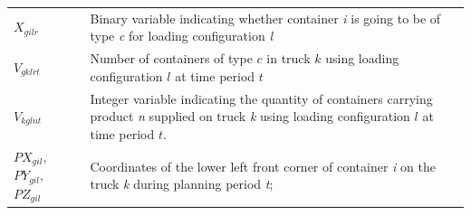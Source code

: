 \begin{longtable}[hbt!]{  |p{}|p{}  |}
  \textit{$X_{gilr}$}                                                                            & Binary variable indicating whether container \textit{i} is going to be of type \textit{c} for loading configuration \textit{l}                                                                                                                                                                                                                                                                                                                                                                                                                                                 \\[0.15cm]
  \textit{$V_{gklrt}$}                                                                           & Number of containers of type $c$ in truck $k$ using loading configuration $l$ at time period $t$                                                                                                                                                                                                                                                                                                                                                                                                                                                                               \\[0.15cm]
  \textit{$V_{kglnt}$}                                                                           & Integer variable indicating the quantity of containers carrying product \textit{n} supplied on truck \textit{k} using loading configuration $l$ at time period $t$.                                                                                                                                                                                                                                                                                                                                                                                                            \\[0.15cm]
  \textit{$PX_{gil},$ $PY_{gil},$ $PZ_{gil}$}                                                    & Coordinates of the lower left front corner of container \textit{i} on the truck \textit{k} during planning period \textit{t};                                                                                                                                                                                                                                                                                                                                                                                                                                                  \\[0.15cm]

\end{longtable}
